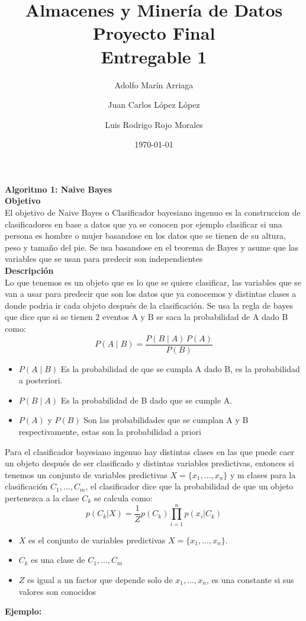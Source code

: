 \documentclass{article}
\title{Almacenes y Minería de Datos \\Proyecto Final\\ Entregable 1}
\author{Adolfo Marín Arriaga \and Juan Carlos López López \and Luis Rodrigo Rojo Morales}
\date{\today\\}
\begin{document}
 \maketitle

 {\bf Algoritmo 1: Naive Bayes}\\

 {\bf Objetivo}\\

 El objetivo de Naive Bayes o Clasificador bayesiano ingenuo es la construccion de clasificadores en base a datos que ya se conocen por ejemplo clasificar si una persona es hombre o mujer basandose
 en los datos que se tienen de su altura, peso y tamaño del pie. Se usa basandose en el teorema de Bayes y asume que las variables que se usan para predecir son
 independientes\\

 {\bf Descripción}\\

 Lo que tenemos es un objeto que es lo que se quiere clasificar, las variables que se van a usar para predecir que son los datos que ya conocemos y distintas clases a donde podria
 ir cada objeto después de la clasificación. Se usa la regla de bayes que dice que si se tienen 2 eventos A y B se saca la probabilidad de A dado B como:
 $$ P(A \mid B) = \frac{P(B \mid A) \, P(A)}{P(B)} $$
 \begin{itemize}
  \item $P(A \mid B)$ Es la probabilidad de que se cumpla  A dado B, es la probabilidad a posteriori.
  \item $P(B \mid A)$ Es la probabilidad de B dado que se cumple A.
  \item $P(A)$ y $P(B)$ Son las probabilidades que se cumplan A y B respectivamente, estas son la probabilidad a priori
 \end{itemize}
 Para el clasificador bayesiano ingenuo hay distintas clases en las que puede caer un objeto después de ser clasificado y distintas variables predictivas, entonces
 si tenemos un conjunto de variables predictivas $X=\{x_1,...,x_n\}$ y m clases para la clasificación $C_1,...,C_m$, el clasificador dice que la
 probabilidad de que un objeto pertenezca a la clase $C_k$ se calcula como:
 \begin{equation*}
 p(C_k|X)=\frac{1}{Z}p(C_k)\prod_{i=1}^{n}p(x_i|C_k)
 \end{equation*}
 \begin{itemize}
  \item $X$ es el conjunto de variables predictivas $X=\{x_1,...,x_n\}$.
  \item $C_k$ es una clase de $C_1,...,C_m$
  \item $Z$ es igual a un factor que depende solo de $x_1,...,x_n$, es una constante si sus valores son conocidos

 \end{itemize}
{\bf Ejemplo:}\\
\end{document}
